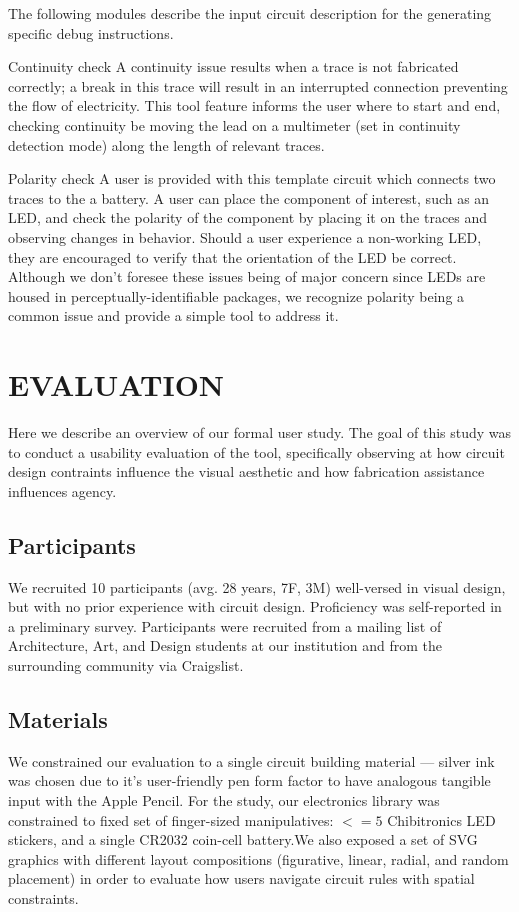 \documentclass{sigchi}
\begin{document}
        The following modules describe the input circuit description for the generating specific debug instructions.

        Continuity check
        A continuity issue results when a trace is not fabricated correctly; a break in this trace will result in an interrupted connection preventing the flow of electricity. This tool feature informs the user where to start and end, checking continuity be moving the lead on a multimeter (set in continuity detection mode) along the length of relevant traces.

        Polarity check
        A user is provided with this template circuit which connects two traces to the a battery. A user can place the component of interest, such as an LED, and check the polarity of the component by placing it on the traces and observing changes in behavior. Should a user experience a non-working LED, they are encouraged to verify that the orientation of the LED be correct. Although we don't foresee these issues being of major concern since LEDs are housed in perceptually-identifiable packages, we recognize polarity being a common issue and provide a simple tool to address it.




\section{EVALUATION}
    Here we describe an overview of our formal user study. The goal of this study was to conduct a usability evaluation of the tool, specifically observing at how circuit design contraints influence the visual aesthetic and how fabrication assistance influences agency. 

\subsection{Participants}
    We recruited 10 participants (avg. 28 years, 7F, 3M) well-versed in visual design, but with no prior experience with circuit design. Proficiency was self-reported in a preliminary survey. Participants were recruited from a mailing list of Architecture, Art, and Design students at our institution and from the surrounding community via Craigslist.

\subsection{Materials}
    We constrained our evaluation to a single circuit building material --- silver ink was chosen due to it's user-friendly pen form factor to have analogous tangible input with the Apple Pencil. For the study, our electronics library was constrained to fixed set of finger-sized manipulatives: $<= 5$ Chibitronics LED stickers, and a single CR2032 coin-cell battery.We also exposed a set of SVG graphics with different layout compositions (figurative, linear, radial, and random placement) in order to evaluate how users navigate circuit rules with spatial constraints. 
\end{document}
